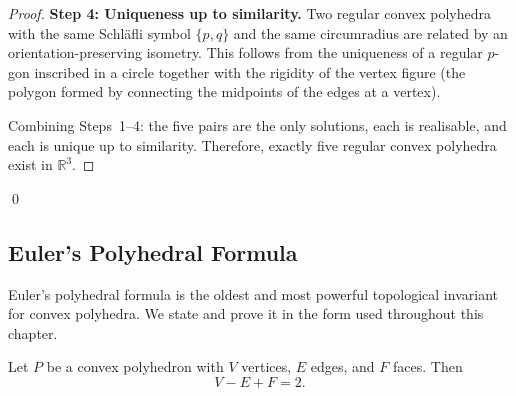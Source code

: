 \begin{proof}
\medskip
\noindent\textbf{Step 4: Uniqueness up to similarity.}
Two regular convex polyhedra with the same Schläfli symbol $\{p,q\}$ and the
same circumradius are related by an orientation-preserving isometry.  This
follows from the uniqueness of a regular $p$-gon inscribed in a circle
together with the rigidity of the vertex figure (the polygon formed by
connecting the midpoints of the edges at a vertex).

\medskip
Combining Steps~1–4: the five pairs are the only solutions, each is
realisable, and each is unique up to similarity.  Therefore, exactly five
regular convex polyhedra exist in $\mathbb{R}^{3}$.
\end{proof}
\qed

\subsection{Euler's Polyhedral Formula}
\label{sec:euler-formula}

Euler's polyhedral formula is the oldest and most powerful topological
invariant for convex polyhedra.  We state and prove it in the form used
throughout this chapter.

\begin{theorem}
\label{thm:euler-formula}
Let $P$ be a convex polyhedron with $V$ vertices, $E$ edges, and $F$ faces.
Then
\[
  V - E + F = 2.
\]
\end{theorem}

